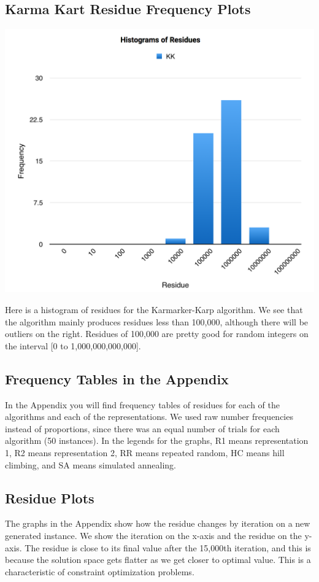 \documentclass[11pt]{article}
\begin{document}
\subsection{Karma Kart Residue Frequency Plots}
\begin{center}
\includegraphics[scale=0.5]{kkinsto.png}
\end{center}


Here is a histogram of residues for the Karmarker-Karp algorithm. We see that the algorithm mainly produces residues less than 100,000, although there will be outliers on the right. Residues of 100,000 are pretty good for random integers on the interval [0 to 1,000,000,000,000].



\subsection{Frequency Tables in the Appendix}
In the Appendix  you will find frequency tables of residues for each of the algorithms and each of the representations. We used raw number frequencies instead of proportions, since there was an equal number of trials for each algorithm (50 instances). In the legends for the graphs, R1 means representation 1, R2 means representation 2, RR means repeated random, HC means hill climbing, and SA means simulated annealing. 



\subsection{Residue Plots}
The graphs in the Appendix show how the residue changes by iteration on a new generated instance. We show the iteration on the x-axis and the residue on the y-axis. The residue is close to its final value after the 15,000th iteration, and this is because the solution space gets flatter as we get closer to optimal value. This is a characteristic of constraint optimization problems. 
 
\end{document}
